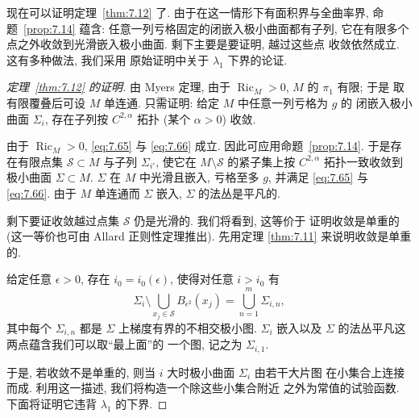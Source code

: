 现在可以证明定理~\ref{thm:7.12} 了. 由于在这一情形下有面积界与全曲率界,
命题~\ref{prop:7.14} 蕴含: 任意一列亏格固定的闭嵌入极小曲面都有子列,
它在有限多个点之外收敛到光滑嵌入极小曲面. 剩下主要是要证明, 越过这些点
收敛依然成立. 这有多种做法, 我们采用 \cite{CiSc} 原始证明中关于
$\lambda_1$ 下界的论证.

\begin{proof}[定理~\ref{thm:7.12} 的证明]
由 Myers 定理, 由于 $\operatorname{Ric}_M>0$, $M$ 的 $\pi_1$ 有限; 于是
取有限覆叠后可设 $M$ 单连通. 只需证明: 给定 $M$ 中任意一列亏格为 $g$ 的
闭嵌入极小曲面 $\Sigma_i$, 存在子列按 $C^{2,\alpha}$ 拓扑 (某个 $\alpha>0$)
收敛.

由于 $\operatorname{Ric}_M>0$, \eqref{eq:7.65} 与 \eqref{eq:7.66} 成立.
因此可应用命题~\ref{prop:7.14}. 于是存在有限点集
$\mathcal{S}\subset M$ 与子列 $\Sigma_{i'}$, 使它在 $M\setminus\mathcal{S}$
的紧子集上按 $C^{2,\alpha}$ 拓扑一致收敛到极小曲面 $\Sigma\subset M$.
$\Sigma$ 在 $M$ 中光滑且嵌入, 亏格至多 $g$, 并满足 \eqref{eq:7.65} 与
\eqref{eq:7.66}. 由于 $M$ 单连通而 $\Sigma$ 嵌入, $\Sigma$ 的法丛是平凡的.

剩下要证收敛越过点集 $\mathcal{S}$ 仍是光滑的. 我们将看到, 这等价于
证明收敛是单重的 (这一等价也可由 Allard 正则性定理推出). 先用定理
\ref{thm:7.11} 来说明收敛是单重的.

给定任意 $\epsilon>0$, 存在 $i_0=i_0(\epsilon)$, 使得对任意 $i>i_0$ 有
\begin{equation}
\Sigma_i\setminus\bigcup_{x_j\in\mathcal{S}}B_{\epsilon^2}(x_j)
=\bigcup_{n=1}^m\Sigma_{i,n},
\label{eq:7.82}
\end{equation}
其中每个 $\Sigma_{i,n}$ 都是 $\Sigma$ 上梯度有界的不相交极小图.
$\Sigma_i$ 嵌入以及 $\Sigma$ 的法丛平凡这两点蕴含我们可以取``最上面''的
一个图, 记之为 $\Sigma_{i,1}$.

于是, 若收敛不是单重的, 则当 $i$ 大时极小曲面 $\Sigma_i$ 由若干大片图
在小集合上连接而成. 利用这一描述, 我们将构造一个除这些小集合附近
之外为常值的试验函数. 下面将证明它违背 $\lambda_1$ 的下界.


\end{proof}
